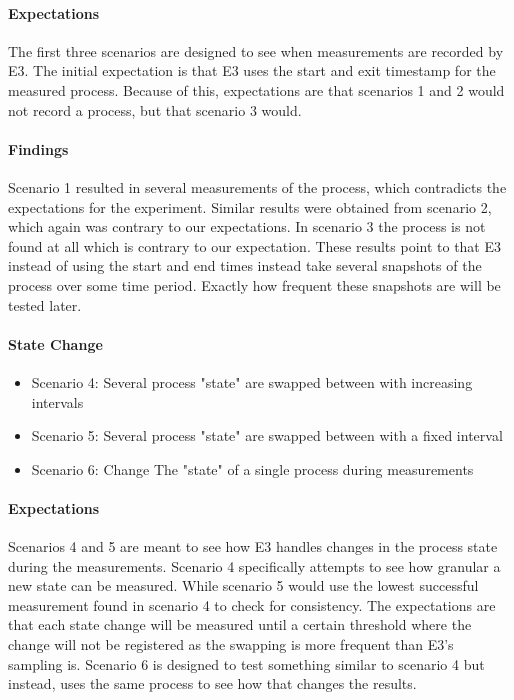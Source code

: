 \paragraph {Expectations}
The first three scenarios are designed to see when measurements are recorded by E3. The initial expectation is that E3 uses the start and exit timestamp for the measured process. Because of this, expectations are that scenarios 1 and 2 would not record a process, but that scenario 3 would.

\paragraph{Findings}
Scenario 1 resulted in several measurements of the process, which contradicts the expectations for the experiment. Similar results were obtained from scenario 2, which again was contrary to our expectations. In scenario 3 the process is not found at all which is contrary to our expectation. These results point to that E3 instead of using the start and end times instead take several snapshots of the process over some time period. Exactly how frequent these snapshots are will be tested later. 

\paragraph{State Change}

\begin{itemize}
    \item Scenario 4: Several process "state" are swapped between with increasing intervals
    \item Scenario 5: Several process "state" are swapped between with a fixed interval
    \item Scenario 6: Change The "state" of a single process during measurements
\end{itemize}

\paragraph{Expectations}
Scenarios 4 and 5 are meant to see how E3 handles changes in the process state during the measurements. Scenario 4 specifically attempts to see how granular a new state can be measured. While scenario 5 would use the lowest successful measurement found in scenario 4 to check for consistency. The expectations are that each state change will be measured until a certain threshold where the change will not be registered as the swapping is more frequent than E3's sampling is. Scenario 6 is designed to test something similar to scenario 4 but instead, uses the same process to see how that changes the results.
